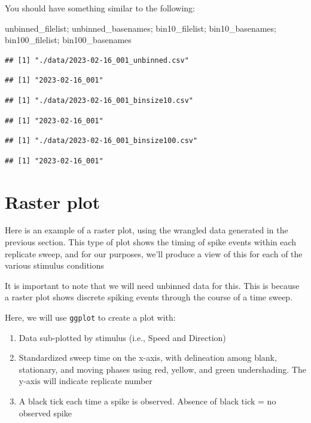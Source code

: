 \documentclass[
]{book}
\newenvironment{Shaded}{\begin{snugshade}}{\end{snugshade}}
\newcommand{\NormalTok}[1]{#1}
\providecommand{\tightlist}{%
  \setlength{\itemsep}{0pt}\setlength{\parskip}{0pt}}
\begin{document}
You should have something similar to the following:

\begin{Shaded}
\begin{Highlighting}[]
\NormalTok{unbinned\_filelist; unbinned\_basenames; bin10\_filelist; bin10\_basenames; bin100\_filelist; bin100\_basenames}
\end{Highlighting}
\end{Shaded}

\begin{verbatim}
## [1] "./data/2023-02-16_001_unbinned.csv"
\end{verbatim}

\begin{verbatim}
## [1] "2023-02-16_001"
\end{verbatim}

\begin{verbatim}
## [1] "./data/2023-02-16_001_binsize10.csv"
\end{verbatim}

\begin{verbatim}
## [1] "2023-02-16_001"
\end{verbatim}

\begin{verbatim}
## [1] "./data/2023-02-16_001_binsize100.csv"
\end{verbatim}

\begin{verbatim}
## [1] "2023-02-16_001"
\end{verbatim}

\hypertarget{raster-plot}{%
\section{Raster plot}\label{raster-plot}}

Here is an example of a raster plot, using the wrangled data generated
in the previous section. This type of plot shows the timing of spike
events within each replicate sweep, and for our purposes, we'll
produce a view of this for each of the various stimulus conditions

It is important to note that we will need unbinned data for this. This
is because a raster plot shows discrete spiking events through the
course of a time sweep.

Here, we will use \texttt{ggplot} to create a plot with:

\begin{enumerate}
\def\labelenumi{\arabic{enumi}.}
\tightlist
\item
  Data sub-plotted by stimulus (i.e., Speed and Direction)
\item
  Standardized sweep time on the x-axis, with delineation among
  blank, stationary, and moving phases using red, yellow, and green
  undershading. The y-axis will indicate replicate number
\item
  A black tick each time a spike is observed. Absence of black tick = no
  observed spike
\end{enumerate}
\end{document}
